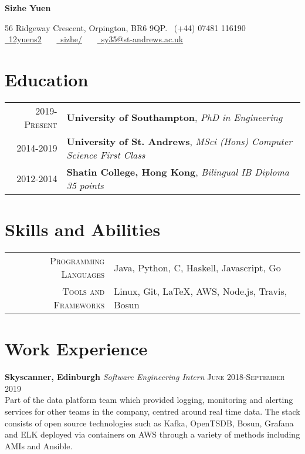 \documentclass{article}
\begin{document}
\pagestyle{empty} %


\par{\centering
		{\Large \textbf{Sizhe Yuen}
	}\par}

\begin{center}
56 Ridgeway Crescent, Orpington, BR6 9QP. \faMobile\ (+44) 07481 116190\\
\href{https://github.com/12yuens2}{\faGithub\ 12yuens2} \ \ \ \href{https://www.linkedin.com/in/sizhe/}{\faLinkedin\ sizhe/} \ \ \ \href{mailto:sy35@st-andrews.ac.uk}{\faEnvelopeO\ sy35@st-andrews.ac.uk}
\end{center}


\section*{Education}
\begin{tabular}{r|p{15cm}}
\textsc{2019-Present} & \textbf{University of Southampton}, \textit{PhD in Engineering}
\\
\textsc{2014-2019} & \textbf{University of St. Andrews}, \textit{MSci (Hons) Computer Science First Class}
\\
\textsc{2012-2014} & \textbf{Shatin College, Hong Kong}, \textit{Bilingual IB Diploma 35 points}
\end{tabular}

\section*{Skills and Abilities}
\begin{tabular}{r|p{15cm}}
\textsc{Programming Languages} & Java, Python, C, Haskell, Javascript, Go\\

\textsc{Tools and Frameworks} & Linux, Git, \LaTeX, AWS, Node.js, Travis, Bosun
\end{tabular}

\section*{Work Experience}
\textbf{Skyscanner, Edinburgh} \textit{Software Engineering Intern}
\hfill
\textsc{June 2018-September 2019} \\
Part of the data platform team which provided logging, monitoring and alerting services for other teams in the company, centred around real time data. The stack consists of open source technologies such as Kafka, OpenTSDB, Bosun, Grafana and ELK deployed via containers on AWS through a variety of methods including AMIs and Ansible.
\end{document}
